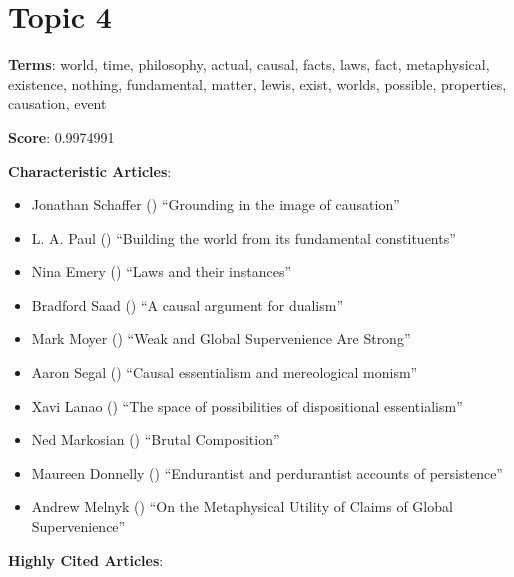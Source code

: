 \documentclass[
  10pt,
  letterpaper,
  DIV=11,
  numbers=noendperiod,
  twoside]{scrartcl}
\providecommand{\tightlist}{%
  \setlength{\itemsep}{0pt}\setlength{\parskip}{0pt}}\usepackage{longtable,booktabs,array}
\begin{document}
\section{Topic 4}\label{topic-4}

\textbf{Terms}: world, time, philosophy, actual, causal, facts, laws,
fact, metaphysical, existence, nothing, fundamental, matter, lewis,
exist, worlds, possible, properties, causation, event

\textbf{Score}: 0.9974991

\textbf{Characteristic Articles}:

\begin{itemize}
\tightlist
\item
  Jonathan Schaffer ()
  ``Grounding in the image of causation''
\item
  L. A. Paul () ``Building the
  world from its fundamental constituents''
\item
  Nina Emery
  ()
  ``Laws and their instances''
\item
  Bradford Saad () ``A causal
  argument for dualism''
\item
  Mark Moyer () ``Weak and Global
  Supervenience Are Strong''
\item
  Aaron Segal () ``Causal
  essentialism and mereological monism''
\item
  Xavi Lanao () ``The space of
  possibilities of dispositional essentialism''
\item
  Ned Markosian () ``Brutal
  Composition''
\item
  Maureen Donnelly ()
  ``Endurantist and perdurantist accounts of persistence''
\item
  Andrew Melnyk () ``On the
  Metaphysical Utility of Claims of Global Supervenience''
\end{itemize}

\textbf{Highly Cited Articles}:
\end{document}
